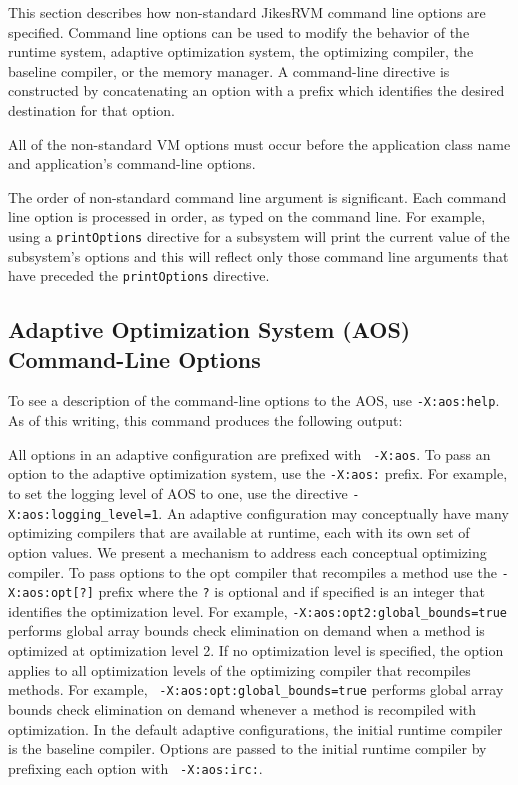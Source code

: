 \label{subsection:cmdline}

This section describes how non-standard Jikes\trademark RVM command
line options are specified. Command line options can be used to modify
the behavior of the runtime system, adaptive optimization system, the
optimizing compiler, the baseline compiler, or the memory manager.  A
command-line directive is constructed by concatenating an option with
a prefix which identifies the desired destination for that option.

All of the non-standard VM options must occur before 
the application class name and application's command-line options.

The order of non-standard command line argument is significant. Each
command line option is processed in order, as typed on the command
line. For example, using a {\tt printOptions} directive for a
subsystem will print the current value of the subsystem's options and
this will reflect only those command line arguments that have preceded
the {\tt printOptions} directive.


\subsection{Adaptive Optimization System (AOS) Command-Line Options}

To see a description of the command-line options to the AOS, use 
{\tt -X:aos:help}.  As of this writing, this command produces the
following output:

\T \begin{tiny}

\T \end{tiny}

All options in an adaptive configuration are prefixed with {\tt
-X:aos}.  To pass an option to the adaptive optimization system, use
the {\tt -X:aos:} prefix.  For example, to set the logging level of
AOS to one, use the directive {\tt -X:aos:logging\_level=1}. An
adaptive configuration may conceptually have many optimizing compilers
that are available at runtime, each with its own set of option values.
We present a mechanism to address each conceptual optimizing compiler.
To pass options to the opt compiler that recompiles a method use the
{\tt -X:aos:opt[?]} prefix where the {\tt ?} is optional and if
specified is an integer that identifies the optimization level.  For
example, {\tt -X:aos:opt2:global\_bounds=true} performs global array
bounds check elimination on demand when a method is optimized at
optimization level 2.  If no optimization level is specified, the
option applies to all optimization levels of the optimizing compiler
that recompiles methods.  For example, {\tt
-X:aos:opt:global\_bounds=true} performs global array bounds check
elimination on demand whenever a method is recompiled with
optimization.  In the default adaptive configurations, the initial
runtime compiler is the baseline compiler.  Options are passed to the
initial runtime compiler by prefixing each option with {\tt
-X:aos:irc:}.  


